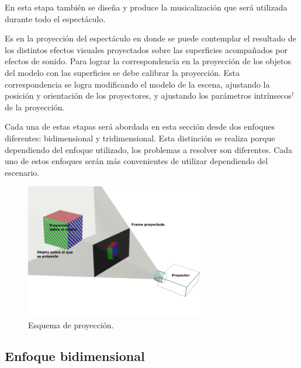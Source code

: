 En esta etapa también se diseña y produce la musicalización que será utilizada durante todo el espectáculo.

Es en la proyección del espectáculo en donde se puede contemplar el resultado de los distintos efectos visuales proyectados sobre las superficies acompañados por efectos de sonido.
Para lograr la correspondencia en la proyección de los objetos del modelo con las superficies se debe calibrar la proyección.
Esta correspondencia se logra modificando el modelo de la escena, ajustando la posición y orientación de los proyectores, y ajustando los parámetros intrínsecos$^\dagger$ de la proyección.

Cada una de estas etapas será abordada en esta sección desde dos enfoques diferentes: bidimensional y tridimensional.
Esta distinción se realiza porque dependiendo del enfoque utilizado, los problemas a resolver son diferentes.
Cada uno de estos enfoques serán más convenientes de utilizar dependiendo del escenario.

% 
%

\begin{figure}[H]
  \centering
    \includegraphics[width=0.7\textwidth]{./Cap2_videomapping/proy2dvs3d}
  \caption[Imagen propia]{Esquema de proyección.}
  \label{fig:proy2dvs3d}
\end{figure}

\subsection{Enfoque bidimensional}

